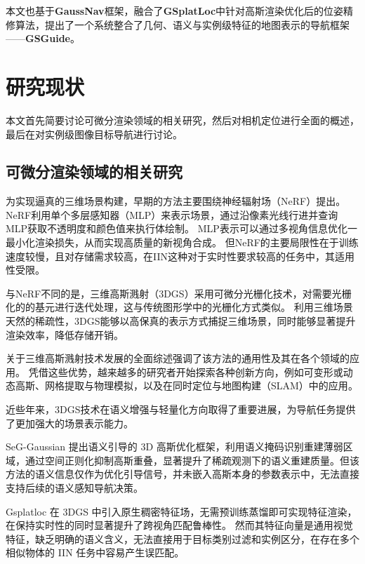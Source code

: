 本文也基于\textbf{GaussNav}\cite{gaussnav}框架，融合了\textbf{GSplatLoc}\cite{gsplatloc}中针对高斯渲染优化后的位姿精修算法，提出了一个系统整合了几何、语义与实例级特征的地图表示的导航框架——\textbf{GSGuide}。


\section{研究现状}
本文首先简要讨论可微分渲染领域的相关研究，然后对相机定位进行全面的概述，最后在对实例级图像目标导航进行讨论。

\subsection{可微分渲染领域的相关研究}
为实现逼真的三维场景构建，早期的方法主要围绕神经辐射场（NeRF）\cite{nerf}提出。
NeRF\cite{nerf}利用单个多层感知器（MLP）来表示场景，通过沿像素光线行进并查询MLP获取不透明度和颜色值来执行体绘制。
MLP表示可以通过多视角信息优化一最小化渲染损失，从而实现高质量的新视角合成。
但NeRF\cite{nerf}的主要局限性在于训练速度较慢，且对存储需求较高，在IIN这种对于实时性要求较高的任务中，其适用性受限。

与NeRF\cite{nerf}不同的是，三维高斯溅射（3DGS）\cite{3DGS}采用可微分光栅化技术，对需要光栅化的的基元进行迭代处理，这与传统图形学中的光栅化方式类似。
利用三维场景天然的稀疏性，3DGS\cite{3DGS}能够以高保真的表示方式捕捉三维场景，同时能够显著提升渲染效率，降低存储开销。

关于三维高斯溅射技术发展的全面综述\cite{chen2024survey}强调了该方法的通用性及其在各个领域的应用。
凭借这些优势，越来越多的研究者开始探索各种创新方向，例如可变形或动态高斯\cite{luiten2024dynamic,wu20244d}、网格提取与物理模拟\cite{feng2024gaussian,xie2024physgaussian}，以及在同时定位与地图构建（SLAM）中的应用\cite{keetha2024splatam,yugay2023gaussian}。

近些年来，3DGS技术在语义增强与轻量化方向取得了重要进展，为导航任务提供了更加强大的场景表示能力。

SeG-Gaussian\cite{seg-gaussian} 提出语义引导的 3D 高斯优化框架，利用语义掩码识别重建薄弱区域，通过空间正则化抑制高斯重叠，显著提升了稀疏观测下的语义重建质量。但该方法的语义信息仅作为优化引导信号，并未嵌入高斯本身的参数表示中，无法直接支持后续的语义感知导航决策。

Gsplatloc\cite{gsplatloc} 在 3DGS 中引入原生稠密特征场，无需预训练蒸馏即可实现特征渲染，在保持实时性的同时显著提升了跨视角匹配鲁棒性。
然而其特征向量是通用视觉特征，缺乏明确的语义含义，无法直接用于目标类别过滤和实例区分，在存在多个相似物体的 IIN 任务中容易产生误匹配。

